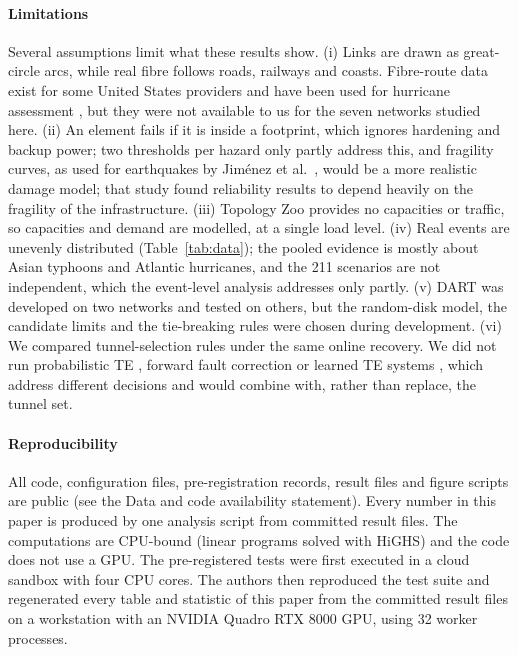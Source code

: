 \documentclass[preprint,12pt]{elsarticle}
\begin{document}
\paragraph{Limitations}
Several assumptions limit what these results show. (i) Links are drawn as great-circle arcs, while real fibre follows roads, railways and coasts. Fibre-route data exist for some United States providers and have been used for hurricane assessment \cite{alenazi23}, but they were not available to us for the seven networks studied here. (ii) An element fails if it is inside a footprint, which ignores hardening and backup power; two thresholds per hazard only partly address this, and fragility curves, as used for earthquakes by Jiménez et al.\ \cite{jimenez23}, would be a more realistic damage model; that study found reliability results to depend heavily on the fragility of the infrastructure. (iii) Topology Zoo provides no capacities or traffic, so capacities and demand are modelled, at a single load level. (iv) Real events are unevenly distributed (Table~\ref{tab:data}); the pooled evidence is mostly about Asian typhoons and Atlantic hurricanes, and the 211 scenarios are not independent, which the event-level analysis addresses only partly. (v) DART was developed on two networks and tested on others, but the random-disk model, the candidate limits and the tie-breaking rules were chosen during development. (vi) We compared tunnel-selection rules under the same online recovery. We did not run probabilistic TE \cite{teavar19}, forward fault correction \cite{ffc14} or learned TE systems \cite{harp24,pathgnn25}, which address different decisions and would combine with, rather than replace, the tunnel set.

\paragraph{Reproducibility}
All code, configuration files, pre-registration records, result files and figure scripts are public (see the Data and code availability statement). Every number in this paper is produced by one analysis script from committed result files. The computations are CPU-bound (linear programs solved with HiGHS) and the code does not use a GPU. The pre-registered tests were first executed in a cloud sandbox with four CPU cores. The authors then reproduced the test suite and regenerated every table and statistic of this paper from the committed result files on a workstation with an NVIDIA Quadro RTX 8000 GPU, using 32 worker processes.
\end{document}
